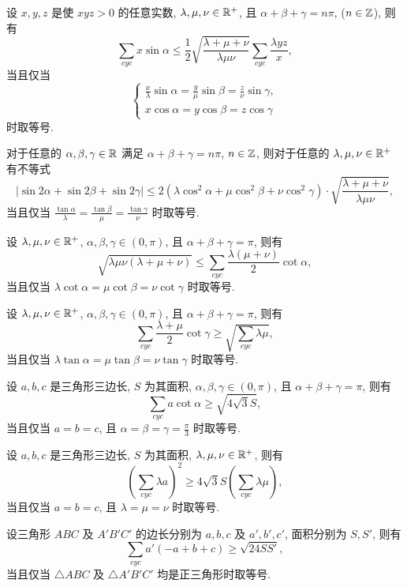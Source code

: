 设 $x,y,z$ 是使 $xyz>0$ 的任意实数, $\lambda,\mu,\nu\in\mathbb{R}^{+}$, 且 $\alpha+\beta+\gamma=n\pi$,
($n\in\mathbb{Z}$), 则有
\[
\sum_{cyc}x\sin\alpha\le\frac{1}{2}\sqrt{\frac{\lambda+\mu+\nu}{\lambda\mu\nu}}\sum_{cyc}\frac{\lambda yz}{x},
\]
当且仅当
\[
\begin{cases}
	\frac{x}{\lambda}\sin\alpha=\frac{y}{\mu}\sin\beta=\frac{z}{\nu}\sin\gamma,\\
	x\cos\alpha=y\cos\beta=z\cos\gamma
\end{cases}
\]
时取等号.
\eq

对于任意的 $\alpha,\beta,\gamma\in\mathbb{R}$ 满足 $\alpha+\beta+\gamma=n\pi$,
$n\in\mathbb{Z}$, 则对于任意的 $\lambda,\mu,\nu\in\mathbb{R}^{+}$ 有不等式
\[
\left|\sin2\alpha+\sin2\beta+\sin2\gamma\right|\le2\left(\lambda\cos^{2}\alpha+\mu\cos^{2}\beta+\nu\cos^{2}\gamma\right)\cdot\sqrt{\frac{\lambda+\mu+\nu}{\lambda\mu\nu}},
\]
当且仅当 $\frac{\tan\alpha}{\lambda}=\frac{\tan\beta}{\mu}=\frac{\tan\gamma}{\nu}$
时取等号.
\eq

设 $\lambda,\mu,\nu\in\mathbb{R}^{+}$, $\alpha,\beta,\gamma\in(0,\pi)$,
且 $\alpha+\beta+\gamma=\pi$, 则有 
\[
\sqrt{\lambda\mu\nu(\lambda+\mu+\nu)}\le\sum_{cyc}\frac{\lambda(\mu+\nu)}{2}\cot\alpha,
\]
当且仅当 $\lambda\cot\alpha=\mu\cot\beta=\nu\cot\gamma$ 时取等号.
\eq

设 $\lambda,\mu,\nu\in\mathbb{R}^{+}$, $\alpha,\beta,\gamma\in(0,\pi)$,
且 $\alpha+\beta+\gamma=\pi$, 则有 
\[
\sum_{cyc}\frac{\lambda+\mu}{2}\cot\gamma\ge\sqrt{\sum\limits_{cyc}\lambda\mu},
\]
当且仅当 $\lambda\tan\alpha=\mu\tan\beta=\nu\tan\gamma$ 时取等号.
\eq

设 $a,b,c$ 是三角形三边长, $S$ 为其面积, $\alpha,\beta,\gamma\in(0,\pi)$, 且
$\alpha+\beta+\gamma=\pi$, 则有
\[
\sum_{cyc}a\cot\alpha\ge\sqrt{4\sqrt{3}S},
\]
当且仅当 $a=b=c$, 且 $\alpha=\beta=\gamma=\frac{\pi}{3}$ 时取等号.
\eq

设 $a,b,c$ 是三角形三边长, $S$ 为其面积, $\lambda,\mu,\nu\in\mathbb{R}^{+}$, 则有
\[
\left(\sum_{cyc}\lambda a\right)^{2}\ge4\sqrt{3}S\left(\sum_{cyc}\lambda\mu\right),
\]
当且仅当 $a=b=c$, 且 $\lambda=\mu=\nu$ 时取等号.
\eq

设三角形 $ABC$ 及 $A'B'C'$ 的边长分别为 $a,b,c$ 及 $a',b',c'$, 面积分别为 $S,S'$,
则有
\[
\sum_{cyc}a'(-a+b+c)\ge\sqrt{24SS'},
\]
当且仅当 $\triangle ABC$ 及 $\triangle A'B'C'$ 均是正三角形时取等号.
\eq

